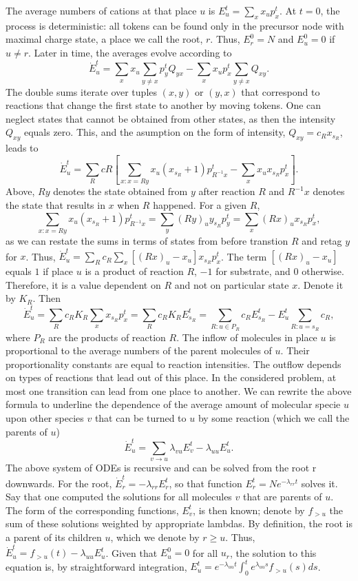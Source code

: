 \documentclass{llncs}
\begin{document}
        The average numbers of cations at that place $u$ is $E_u^t= \sum_x x_up_x^t$. At $t=0$, the process is deterministic: all tokens can be found only in the precursor node with maximal charge state, a place we call the root, $r$. Thus, $E_r^0=N$ and $E_u^0=0$ if $u \not= r$. Later in time, the averages evolve according to
        $$\dot E_u^t=\sum_x x_u \sum_{y\not=x} p_y^t Q_{yx} -\sum_x x_u p_x^t \sum_{y\not=x} Q_{xy}.$$
        The double sums iterate over tuples $(x,y)$ or $(y,x)$ that correspond to reactions that change the first state to another by moving tokens. One can neglect states that cannot be obtained from other states, as then the intensity $Q_{xy}$ equals zero. This, and the asumption on the form of intensity, $Q_{xy}=c_Rx_{s_R}$, leads to
        $$\dot E_u^t = \sum_R cR \left[ \sum_{x:x=Ry}  x_u (x_{s_R}+1) p_{R^{-1}x}^t- \sum_{x} x_u x_{s_R} p_x^t \right].$$
        Above, $Ry$ denotes the state obtained from $y$ after reaction $R$ and $R^{-1}x$ denotes the state that results in $x$ when $R$ happened. For a given $R$,
                $$\sum_{x:x=Ry} x_u (x_{s_R}+1) p_{R^{-1}x}^t = \sum_{y}  (Ry)_u y_{s_R} p_y^t = \sum_x (Rx)_u x_{s_R} p_x^t,$$
        as we can restate the sums in terms of states from before transtion $R$ and retag $y$ for $x$. Thus, $\dot E_u^t = \sum_R c_R \sum_x   \left[(Rx)_u-x_u \right] x_{s_R} p_x^t$. The term $\left[(Rx)_u-x_u\right]$ equals $1$ if place $u$ is a product of reaction $R$, $-1$ for substrate, and $0$ otherwise. Therefore, it is a value dependent on $R$ and not on particular state $x$. Denote it by $K_R$. Then
                $$\dot E_u^t = \sum_R c_R K_R \sum_x x_{s_R} p_x^t = \sum_R c_R K_R E_{s_R}^t = \sum_{R:u\in P_R} c_R E_{s_R}^t - E_u^t \sum_{R: u=s_R}c_R,$$
        where $P_R$ are the products of reaction $R$. The inflow of molecules in place $u$ is proportional to the average numbers of the parent molecules of $u$. Their proportionality constants are equal to reaction intensities. The outflow depends on types of reactions that lead out of this place. In the considered problem, at most one transition can lead from one place to another. We can rewrite the above formula to underline the dependence of the average amount of molecular specie $u$ upon other species $v$ that can be turned to $u$ by some reaction (which we call the parents of $u$)
        $$ \dot E_u^t = \sum_{v\rightarrow u} \lambda_{vu} E_v^t - \lambda_{uu}E_u^t.$$
        The above system of ODEs is recursive and can be solved from the root r downwards. For the root, $\dot E_r^t=-\lambda_{rr} E_r^t$, so that function $E_r^t= Ne^{-\lambda_{rr}t}$ solves it. Say that one computed the solutions for all molecules $v$ that are parents of $u$. The form of the corresponding functions, $E_v^t$, is then known; denote by $f_{>u}$ the sum of these solutions weighted by appropriate lambdas. By definition, the root is a parent of its children $u$, which we denote by $r \geq u$. Thus, $\dot E_u^t=f_{>u}(t)-\lambda_{uu} E_u^t$. Given that $E_u^0=0$ for all $u_r$, the solution to this equation is, by straightforward integration, $E_u^t=e^{-\lambda_{uu}t} \int_0^t e^{\lambda_{uu}s} f_{>u}(s)ds$.
\end{document}
